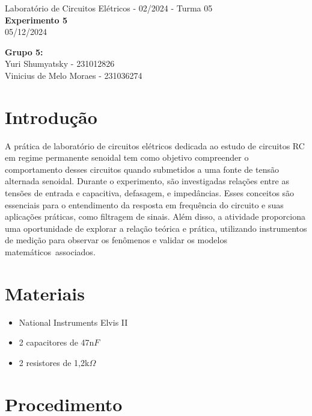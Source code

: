 \documentclass[a4 paper]{article}
\newcommand{\parag}{\hspace{30pt}}
\begin{document}
\justifying
\begin{center}{\large Laboratório de Circuitos Elétricos - 02/2024 - Turma 05}\\
{\large \textbf{Experimento 5}}\\ 
05/12/2024
\end{center}

\vspace{500pt}
 \noindent\textbf{Grupo 5:}\\
 Yuri Shumyatsky - 231012826\\
Vinicius de Melo Moraes - 231036274\\



\vspace{30pt}
\newpage

\section{Introdução}

\parag A prática de laboratório de circuitos elétricos dedicada ao estudo de circuitos RC em regime permanente senoidal tem como objetivo compreender o comportamento desses circuitos quando submetidos a uma fonte de tensão alternada senoidal. Durante o experimento, são investigadas relações entre as tensões de entrada e capacitiva, defasagem, e impedâncias. Esses conceitos são essenciais para o entendimento da resposta em frequência do circuito e suas aplicações práticas, como filtragem de sinais. Além disso, a atividade proporciona uma oportunidade de explorar a relação teórica e prática, utilizando instrumentos de medição para observar os fenômenos e validar os modelos matemáticos associados.

\section{Materiais}


	\begin{itemize}
	\item National Instruments Elvis II
	\item 2 capacitores de 47n$F$
	\item 2 resistores de 1,2k$\Omega$
	
	\end{itemize}

\newpage

\section{Procedimento}
\end{document}
